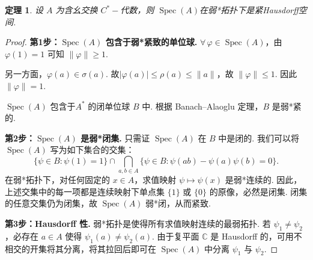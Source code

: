 \documentclass{ctexart}
\newtheorem{theorem}{定理}[section]
\theoremstyle{plain}
\newtheorem*{proof}{证明}
\theoremstyle{plain}
\DeclareMathOperator{\Spec}{Spec}
\begin{document}
\begin{theorem}\label{thm:spec-compact}
    设 $A$ 为含幺交换 $C^*-\!$代数，则 $\Spec(A)$在弱*拓扑下是紧Hausdorff空间.
\end{theorem}
\begin{proof}
    \textbf{第1步：$\Spec(A)$ 包含于弱*紧致的单位球.} 
    $\forall\,\varphi \in \Spec(A)$，由 $\varphi(1) = 1$ 可知 $\|\varphi\| \ge 1$. \par
    另一方面，$\varphi(a) \in \sigma(a)$. 故$|\varphi(a)| \le \rho(a) \le \|a\|$，故 $\|\varphi\| \le 1$. 因此 $\|\varphi\| = 1$.\par
    $\Spec(A)$ 包含于$A^*$ 的闭单位球 $B$ 中. 根据 Banach--Alaoglu 定理，$B$ 是弱*紧的.

    \textbf{第2步：$\Spec(A)$ 是弱*闭集.} 
    只需证 $\Spec(A)$ 在 $B$ 中是闭的. 我们可以将 $\Spec(A)$ 写为如下集合的交集：
    \begin{equation*}
        \{\psi \in B : \psi(1) = 1\} \cap \bigcap_{a,b \in A} \{\psi \in B : \psi(ab) - \psi(a)\psi(b) = 0\}.
    \end{equation*}
    在弱*拓扑下，对任何固定的 $x \in A$，求值映射 $\psi \mapsto \psi(x)$  是弱*连续的. 因此，上述交集中的每一项都是连续映射下单点集 $\{1\}$ 或 $\{0\}$ 的原像，必然是闭集. 闭集的任意交集仍为闭集，故 $\Spec(A)$ 弱*闭，从而紧致.

    \textbf{第3步：Hausdorff 性.} 
    弱*拓扑是使得所有求值映射连续的最弱拓扑. 若 $\psi_1 \neq \psi_2$，必存在 $a \in A$ 使得 $\psi_1(a) \neq \psi_2(a)$. 由于复平面 $\mathbb{C}$ 是 Hausdorff 的，可用不相交的开集将其分离，将其拉回后即可在 $\Spec(A)$ 中分离 $\psi_1$ 与 $\psi_2$.
\end{proof}
\end{document}
